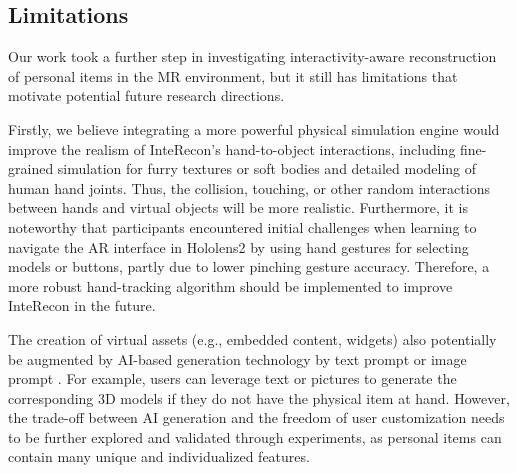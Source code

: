 

\subsection{Limitations}

Our work took a further step in investigating interactivity-aware reconstruction of personal items in the MR environment, but it still has limitations that motivate potential future research directions.

Firstly, we believe integrating a more powerful physical simulation engine would improve the realism of InteRecon's hand-to-object interactions, including fine-grained simulation for furry textures or soft bodies and detailed modeling of human hand joints. 
Thus, the collision, touching, or other random interactions between hands and virtual objects will be more realistic. 
Furthermore, it is noteworthy that participants encountered initial challenges when learning to navigate the AR interface in Hololens2 by using hand gestures for selecting models or buttons, partly due to lower pinching gesture accuracy. Therefore, a more robust hand-tracking algorithm should be implemented to improve InteRecon in the future.

The creation of virtual assets (e.g., embedded content, widgets) also potentially be augmented by AI-based generation technology by text prompt \cite{song2023consistency, zhang2023amphion, liu2024sora} or image prompt \cite{podell2023sdxl, zhu2023minigpt, wang2023dreamvideo}. For example, users can leverage text or pictures to generate the corresponding 3D models if they do not have the physical item at hand. 
However, the trade-off between AI generation and the freedom of user customization needs to be further explored and validated through experiments, as personal items can contain many unique and individualized features.













